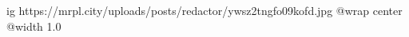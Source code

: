  
 
 
 
 

\ifcmt
  ig https://mrpl.city/uploads/posts/redactor/ywsz2tngfo09kofd.jpg
  @wrap center
  @width 1.0
\fi
